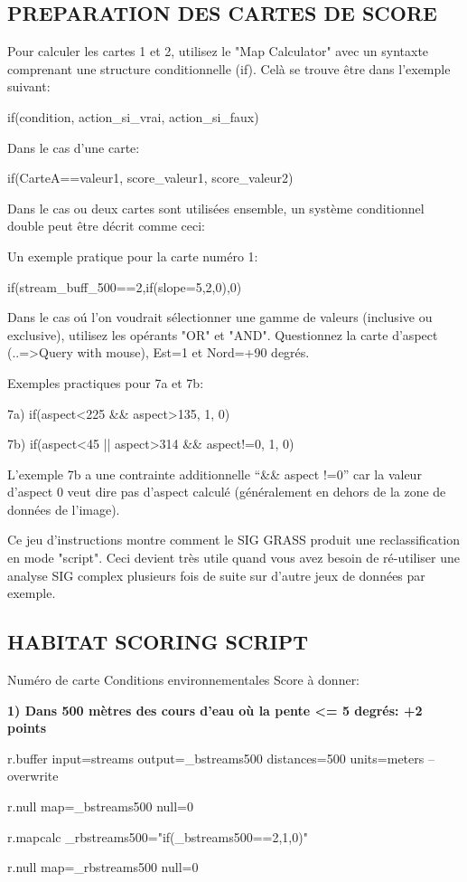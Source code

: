 \subsection{PREPARATION DES CARTES DE SCORE}

Pour calculer les cartes 1 et 2, utilisez le "Map Calculator" avec un syntaxte comprenant une structure conditionnelle (if). Cel\`a se trouve \^etre dans l'exemple suivant:
\begin{smallverbatim}
if(condition, action_si_vrai, action_si_faux)
\end{smallverbatim}
Dans le cas d'une carte:
\begin{smallverbatim}
if(CarteA==valeur1, score_valeur1, score_valeur2)
\end{smallverbatim}
Dans le cas ou deux cartes sont utilis\'ees ensemble, un syst\`eme conditionnel double peut \^etre d\'ecrit comme ceci:

Un exemple pratique pour la carte num\'ero 1:
\begin{smallverbatim}
if(stream_buff_500==2,if(slope=5,2,0),0)
\end{smallverbatim}
Dans le cas o\'u l'on voudrait s\'electionner une gamme de valeurs (inclusive ou exclusive), utilisez les op\'erants "OR" et "AND". Questionnez la carte d'aspect (..=>Query with mouse), Est=1 et Nord=+90 degr\'es.

Exemples practiques pour 7a et 7b:
\begin{smallverbatim}
7a) if(aspect<225 && aspect>135, 1, 0)

7b) if(aspect<45 || aspect>314 && aspect!=0, 1, 0)
\end{smallverbatim}
L'exemple 7b a une contrainte additionnelle ``\&\& aspect !=0'' car la valeur d'aspect 0 veut dire pas d'aspect calcul\'e (g\'en\'eralement en dehors de la zone de donn\'ees de l'image).

Ce jeu d'instructions montre comment le SIG GRASS produit une reclassification en mode "script". Ceci devient tr\`es utile quand vous avez besoin de r\'e-utiliser une analyse SIG complex plusieurs fois de suite sur d'autre jeux de donn\'ees par exemple.

\subsection{HABITAT SCORING SCRIPT}

Num\'ero de carte Conditions environnementales Score \`a donner:

\textbf{
1) Dans 500 m\`etres des cours d'eau o\`u la pente <= 5 degr\'es: +2 points}
\begin{smallverbatim}
r.buffer input=streams output=_bstreams500
 distances=500 units=meters --overwrite

r.null map=_bstreams500 null=0

r.mapcalc _rbstreams500="if(_bstreams500==2,1,0)"

r.null map=_rbstreams500 null=0
\end{smallverbatim}


